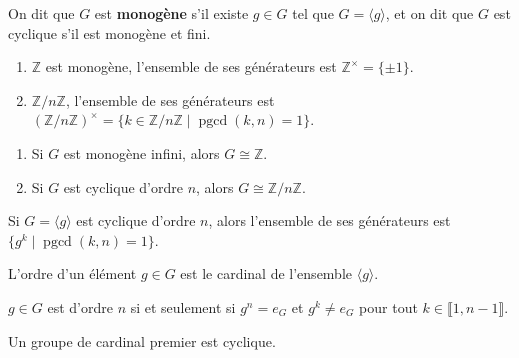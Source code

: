 	\begin{definition}
		On dit que $G$ est \textbf{monogène} s'il existe $g \in G$ tel que $G = \langle g \rangle$, et on dit que $G$ est cyclique s'il est monogène et fini.
	\end{definition}

	\begin{example}
		\begin{enumerate}[label=(\roman*)]
			\item $\mathbb{Z}$ est monogène, l'ensemble de ses générateurs est $\mathbb{Z}^\times = \{ \pm 1 \}$.
			\item $\mathbb{Z}/n\mathbb{Z}$, l'ensemble de ses générateurs est $(\mathbb{Z}/n\mathbb{Z})^\times = \{ k \in \mathbb{Z}/n\mathbb{Z} \mid \operatorname{pgcd}(k,n) = 1 \}$.
		\end{enumerate}
	\end{example}

	\begin{theorem}
		\begin{enumerate}[label=(\roman*)]
			\item Si $G$ est monogène infini, alors $G \cong \mathbb{Z}$.
			\item Si $G$ est cyclique d'ordre $n$, alors $G \cong \mathbb{Z}/n\mathbb{Z}$.
		\end{enumerate}
	\end{theorem}

	\begin{corollary}
		Si $G = \langle g \rangle$ est cyclique d'ordre $n$, alors l'ensemble de ses générateurs est $\{ g^k \mid \operatorname{pgcd}(k,n) = 1 \}$.
	\end{corollary}


	\begin{definition}
		L'ordre d'un élément $g \in G$ est le cardinal de l'ensemble $\langle g \rangle$.
	\end{definition}

	\begin{remark}
		$g \in G$ est d'ordre $n$ si et seulement si $g^n = e_G$ et $g^k \neq e_G$ pour tout $k \in \llbracket 1,n-1 \rrbracket$.
	\end{remark}


	\begin{proposition}
		Un groupe de cardinal premier est cyclique.
	\end{proposition}

